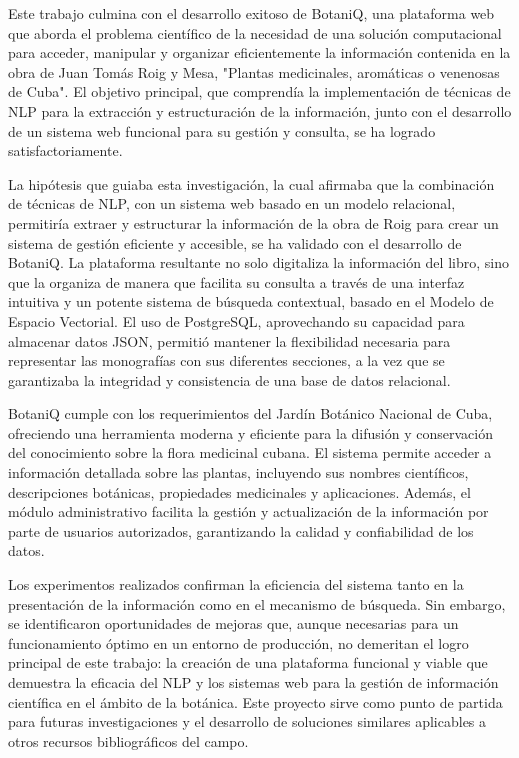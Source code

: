 \begin{conclusions}
    Este trabajo culmina con el desarrollo exitoso de BotaniQ, una plataforma web 
    que aborda el problema científico de la necesidad de una solución computacional 
    para acceder, manipular y organizar eficientemente la información contenida 
    en la obra de Juan Tomás Roig y Mesa, "Plantas medicinales, aromáticas o venenosas de Cuba". 
    El objetivo principal, que comprendía la implementación de técnicas de NLP para 
    la extracción y estructuración de la información, junto con el desarrollo de 
    un sistema web funcional para su gestión y consulta, se ha logrado satisfactoriamente.

    La hipótesis que guiaba esta investigación, la cual afirmaba que la combinación 
    de técnicas de NLP, con un sistema web basado en un modelo relacional, permitiría 
    extraer y estructurar la información de la obra de Roig para crear un sistema 
    de gestión eficiente y accesible, se ha validado con el desarrollo de BotaniQ. 
    La plataforma resultante no solo digitaliza la información del libro, sino que 
    la organiza de manera que facilita su consulta a través de una interfaz intuitiva 
    y un potente sistema de búsqueda contextual, basado en el Modelo de Espacio Vectorial. 
    El uso de PostgreSQL, aprovechando su capacidad para almacenar datos JSON, 
    permitió mantener la flexibilidad necesaria para representar las monografías 
    con sus diferentes secciones, a la vez que se garantizaba la integridad y 
    consistencia de una base de datos relacional.

    BotaniQ cumple con los requerimientos del Jardín Botánico Nacional de Cuba, 
    ofreciendo una herramienta moderna y eficiente para la difusión y conservación del 
    conocimiento sobre la flora medicinal cubana. El sistema permite acceder a información 
    detallada sobre las plantas, incluyendo sus nombres científicos, descripciones botánicas, 
    propiedades medicinales y aplicaciones. Además, el módulo administrativo facilita 
    la gestión y actualización de la información por parte de usuarios autorizados, 
    garantizando la calidad y confiabilidad de los datos.

    Los experimentos realizados confirman la eficiencia del sistema tanto en la 
    presentación de la información como en el mecanismo de búsqueda. Sin embargo, 
    se identificaron oportunidades de mejoras que, aunque necesarias para un 
    funcionamiento óptimo en un entorno de producción, no demeritan el logro principal 
    de este trabajo: la creación de una plataforma funcional y viable que demuestra 
    la eficacia del NLP y los sistemas web para la gestión de información científica 
    en el ámbito de la botánica. Este proyecto sirve como punto de partida para 
    futuras investigaciones y el desarrollo de soluciones similares aplicables a 
    otros recursos bibliográficos del campo.
\end{conclusions}
